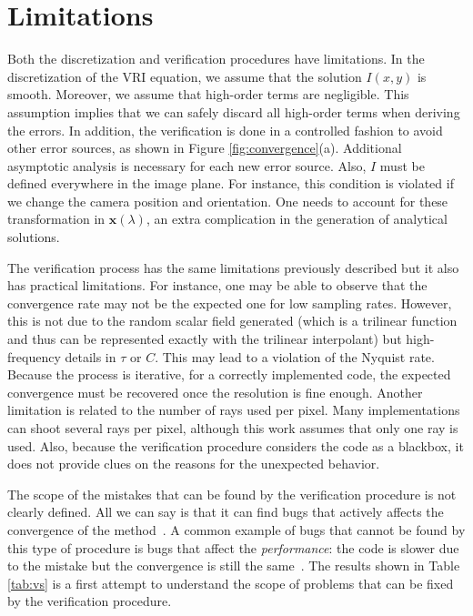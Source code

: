\section{Limitations}
\label{sec:limitations}
 
Both the discretization and verification procedures have
limitations. In the discretization of the VRI equation, we assume that
the solution $I(x,y)$ is smooth. Moreover, we assume that high-order
terms are negligible. This assumption implies that we can safely
discard all high-order terms when deriving the errors.  In addition,
the verification is done in a controlled fashion to avoid other error
sources, as shown in 
Figure \ref{fig:convergence}(a). Additional asymptotic analysis 
is necessary for each new error source. Also, $I$ must
be defined everywhere in the image plane. For instance, this condition
is violated if we change the camera position and orientation. One
needs to account for these transformation in $\mathbf{x}(\lambda)$, an
extra complication in the generation of analytical solutions.

The verification process has the same limitations previously described
but it also has practical limitations. For instance, one may be able
to observe that the convergence rate may not be the expected one for
low sampling rates. However, this is not due to the random scalar
field generated (which is a trilinear function and thus can be
represented exactly with the trilinear interpolant) but
high-frequency details in $\tau$ or $C$. This may lead to a violation
of the Nyquist rate. Because the process is iterative, for a correctly
implemented code, the expected convergence must be recovered once the
resolution is fine enough.  Another limitation is related to the number of
rays used per pixel. Many implementations can shoot several rays per
pixel, although this work assumes that only one ray is used. Also,
because the verification procedure considers the code as a blackbox,
it does not provide clues on the reasons for the unexpected behavior.

The scope of the mistakes that can be found by the verification
procedure is not clearly defined. All we can say is that it can find
bugs that actively affects the convergence of the
method~\cite{KnuppSalari02}. A common example of bugs that cannot be
found by this type of procedure is bugs that affect the
\emph{performance}: the code is slower due to the mistake but the
convergence is still the same~\cite{roach98}. The results shown in
Table \ref{tab:vs} is a first attempt to understand the scope of problems
that can be fixed by the verification procedure.


